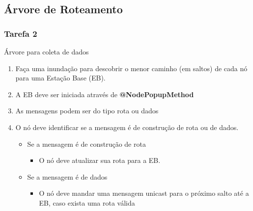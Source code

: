 \documentclass{beamer}
\begin{document}
\subsection{Árvore de Roteamento} %
\begin{frame}
	\frametitle{Tarefa 2}
	\small
	\begin{alertblock}{Árvore para coleta de dados}
		\begin{enumerate}
			\item Faça uma inundação para descobrir o menor caminho (em saltos) de cada nó para uma Estação Base (EB).
			\item A EB deve ser iniciada através de \textbf{@NodePopupMethod}
			\item As mensagens podem ser do tipo rota ou dados
			\item O nó deve identificar se a mensagem é de construção de rota ou de dados.
			\begin{itemize}
				\item Se a mensagem é de construção de rota
				\begin{itemize}
					\item O nó deve atualizar sua rota para a EB.
				\end{itemize}
				\item Se a mensagem é de dados
				\begin{itemize}
					\item O nó deve mandar uma mensagem unicast para o próximo salto até a EB, caso exista uma rota válida
				\end{itemize}
			\end{itemize}
			
		\end{enumerate}
	\end{alertblock}
\end{frame}
\end{document}
